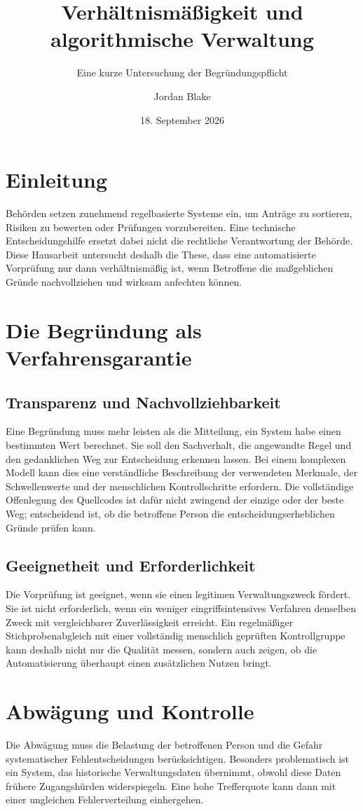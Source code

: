\documentclass[utf8,ngerman,automatter,texgyre,centerpagenumber]{hausarbeit-jura}
\title{Verhältnismäßigkeit und algorithmische Verwaltung}
\subtitle{Eine kurze Untersuchung der Begründungspflicht}
\author[Jordan Blake]{Jordan Blake}
\date{18. September 2026}
\begin{document}
\maketitle

\chapter*{Einleitung}
Behörden setzen zunehmend regelbasierte Systeme ein, um Anträge zu sortieren,
Risiken zu bewerten oder Prüfungen vorzubereiten. Eine technische
Entscheidungshilfe ersetzt dabei nicht die rechtliche Verantwortung der
Behörde. Diese Hausarbeit untersucht deshalb die These, dass eine
automatisierte Vorprüfung nur dann verhältnismäßig ist, wenn Betroffene die
maßgeblichen Gründe nachvollziehen und wirksam anfechten können.

\chapter{Die Begründung als Verfahrensgarantie}
\section{Transparenz und Nachvollziehbarkeit}
Eine Begründung muss mehr leisten als die Mitteilung, ein System habe einen
bestimmten Wert berechnet. Sie soll den Sachverhalt, die angewandte Regel und
den gedanklichen Weg zur Entscheidung erkennen lassen. Bei einem komplexen
Modell kann dies eine verständliche Beschreibung der verwendeten Merkmale,
der Schwellenwerte und der menschlichen Kontrollschritte erfordern. Die
vollständige Offenlegung des Quellcodes ist dafür nicht zwingend der einzige
oder der beste Weg; entscheidend ist, ob die betroffene Person die
entscheidungserheblichen Gründe prüfen kann.

\section{Geeignetheit und Erforderlichkeit}
Die Vorprüfung ist geeignet, wenn sie einen legitimen Verwaltungszweck
fördert. Sie ist nicht erforderlich, wenn ein weniger eingriffsintensives
Verfahren denselben Zweck mit vergleichbarer Zuverlässigkeit erreicht. Ein
regelmäßiger Stichprobenabgleich mit einer vollständig menschlich geprüften
Kontrollgruppe kann deshalb nicht nur die Qualität messen, sondern auch
zeigen, ob die Automatisierung überhaupt einen zusätzlichen Nutzen bringt.

\chapter{Abwägung und Kontrolle}
Die Abwägung muss die Belastung der betroffenen Person und die Gefahr
systematischer Fehlentscheidungen berücksichtigen. Besonders problematisch
ist ein System, das historische Verwaltungsdaten übernimmt, obwohl diese
Daten frühere Zugangshürden widerspiegeln. Eine hohe Trefferquote kann dann
mit einer ungleichen Fehlerverteilung einhergehen.
\end{document}

